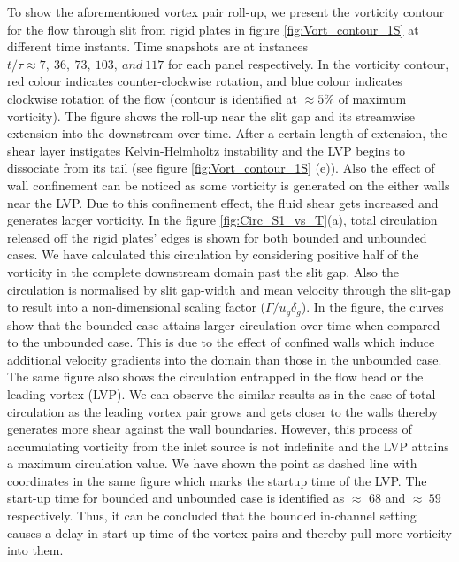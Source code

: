 \documentclass[final,3p,10pt,times,review,authoryear]{elsarticle}
\begin{document}
	To show the aforementioned vortex pair roll-up, we present the vorticity contour for the flow through slit from rigid plates in figure \ref{fig:Vort_contour_1S} at different time instants. Time snapshots are at instances $t/\tau \approx 7,\ 36,\ 73,\ 103, \ and \ 117 $ for each panel respectively. In the vorticity contour, red colour indicates counter-clockwise rotation, and blue colour indicates clockwise rotation of the flow (contour is identified at  $\approx  5\%$ of maximum vorticity). The figure shows the roll-up near the slit gap and its streamwise extension into the downstream over time. After a certain length of extension, the shear layer instigates Kelvin-Helmholtz instability and the LVP begins to dissociate from its tail (see figure \ref{fig:Vort_contour_1S} (e)).  Also the effect of wall confinement can be noticed as some vorticity is generated on the either walls near the LVP. Due to this confinement effect, the fluid shear gets increased and generates larger vorticity. In the figure \ref{fig:Circ_S1_vs_T}(a), total circulation released off the rigid plates' edges is shown for both bounded and unbounded cases. We have calculated this circulation by considering positive half of the vorticity in the complete downstream domain past the slit gap. Also the circulation is normalised by slit gap-width and mean velocity through the slit-gap to result into a non-dimensional scaling factor ($\Gamma/u_g\delta_g$). In the figure, the curves show that the bounded case attains larger circulation over time when compared to the unbounded case. This is due to the effect of confined walls which induce additional velocity gradients into the domain than those in the unbounded case. The same figure also shows the circulation entrapped in the flow head or the leading vortex (LVP). We can observe the similar results as in the case of total circulation as the leading vortex pair grows and gets closer to the walls thereby generates more shear against the wall boundaries. However, this process of accumulating vorticity from the inlet source is not indefinite and the LVP attains a maximum circulation value. We have shown the point as dashed line with coordinates in the same figure which marks the startup time of the LVP. The start-up time for bounded and unbounded case is identified as $\approx$ $68$ and $\approx \ 59$ respectively. Thus, it can be concluded that the bounded in-channel setting causes a delay in start-up time of the vortex pairs and thereby pull more vorticity into them.
\end{document}
